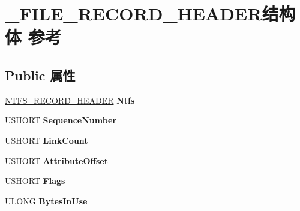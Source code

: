 \hypertarget{struct___f_i_l_e___r_e_c_o_r_d___h_e_a_d_e_r}{}\section{\+\_\+\+F\+I\+L\+E\+\_\+\+R\+E\+C\+O\+R\+D\+\_\+\+H\+E\+A\+D\+E\+R结构体 参考}
\label{struct___f_i_l_e___r_e_c_o_r_d___h_e_a_d_e_r}
\subsection*{Public 属性}
\begin{DoxyCompactItemize}
\item 
\mbox{\label{struct___f_i_l_e___r_e_c_o_r_d___h_e_a_d_e_r_a22edac2e80b5a6f1768dc2aba59099c7}} 
\hyperlink{struct_n_t_f_s___r_e_c_o_r_d___h_e_a_d_e_r}{N\+T\+F\+S\+\_\+\+R\+E\+C\+O\+R\+D\+\_\+\+H\+E\+A\+D\+ER} {\bfseries Ntfs}
\item 
\mbox{\label{struct___f_i_l_e___r_e_c_o_r_d___h_e_a_d_e_r_a07eba5c7ed45d19cd438daa9ebe9702b}} 
U\+S\+H\+O\+RT {\bfseries Sequence\+Number}
\item 
\mbox{\label{struct___f_i_l_e___r_e_c_o_r_d___h_e_a_d_e_r_a457c577d1ade6d114128895308b8121e}} 
U\+S\+H\+O\+RT {\bfseries Link\+Count}
\item 
\mbox{\label{struct___f_i_l_e___r_e_c_o_r_d___h_e_a_d_e_r_a856eaf013353efe285b1e64cb84ecf8b}} 
U\+S\+H\+O\+RT {\bfseries Attribute\+Offset}
\item 
\mbox{\label{struct___f_i_l_e___r_e_c_o_r_d___h_e_a_d_e_r_a10c4c0dd62fb224b6a39e24daa45b349}} 
U\+S\+H\+O\+RT {\bfseries Flags}
\item 
\mbox{\label{struct___f_i_l_e___r_e_c_o_r_d___h_e_a_d_e_r_aa08176d2db31ca4196a6320ae4d8d98f}} 
U\+L\+O\+NG {\bfseries Bytes\+In\+Use}
\item 
\mbox{\label{struct___f_i_l_e___r_e_c_o_r_d___h_e_a_d_e_r_ad561f687cb12962bde45873a8234d423}} 

\end{DoxyCompactItemize}
